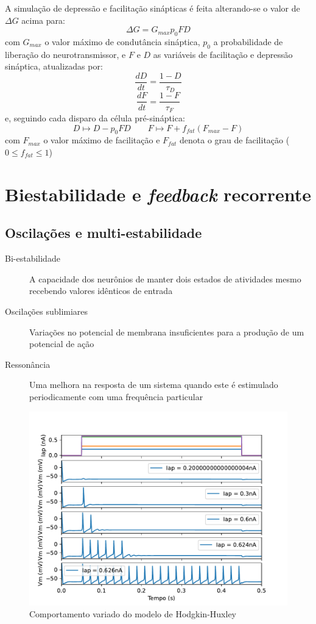 A simulação de depressão e facilitação sinápticas é feita alterando-se o valor de $\Delta G$ acima para:
$$
\Delta G=G_{max}p_0FD
$$
com $G_{max}$ o valor máximo de condutância sináptica, $p_0$ a probabilidade de liberação do neurotransmissor, e $F$ e $D$ as variáveis de facilitação e depressão sináptica, atualizadas por:
$$
\frac{dD}{dt}=\frac{1-D}{\tau_D}
$$$$
\frac{dF}{dt}=\frac{1-F}{\tau_F}
$$
e, seguindo cada disparo da célula pré-sináptica:
$$
D\mapsto D-p_0FD\qquad F\mapsto F+f_{fat}(F_{max}-F)
$$
com $F_{max}$ o valor máximo de facilitação e $F_{fat}$ denota o grau de facilitação ($0\leq f_{fat}\leq 1$)


\section{Biestabilidade e \textit{feedback} recorrente}\label{sec:biestabilidade}

\subsection{Oscilações e multi-estabilidade}
\begin{description}
	\item[Bi-estabilidade] A capacidade dos neurônios de manter dois estados de atividades mesmo recebendo valores idênticos de entrada
	\item[Oscilações sublimiares] Variações no potencial de membrana insuficientes para a produção de um potencial de ação
	\item[Ressonância] Uma melhora na resposta de um sistema quando este é estimulado periodicamente com uma frequência particular
\end{description}

\begin{figure}[h!]
	\centering
	\caption{Comportamento variado do modelo de Hodgkin-Huxley}
	\label{fig:hhdinamico}
	\includegraphics[width=0.7\linewidth]{figs/hh_dinamico}
\end{figure}


